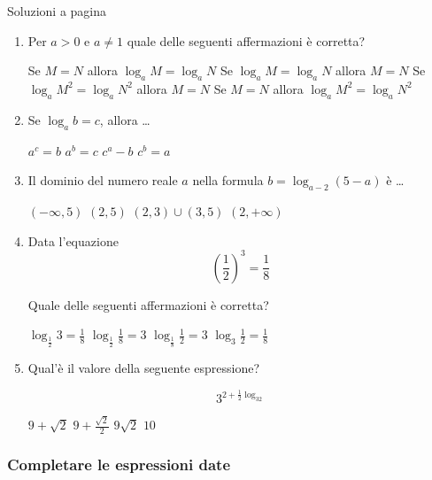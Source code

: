 Soluzioni a pagina \pageref{sol_mc} \label{ex_mc}\label{ex_mc}

\begin{enumerate}

\item Per $a>0$ e $a\neq 1$ quale delle seguenti affermazioni è corretta?

\begin{choices}
\choice Se $M=N$ allora $\log_aM=\log_aN$
\choice Se $\log_aM=\log_aN$ allora $M=N$
\choice Se $\log_aM^2=\log_aN^2$ allora $M=N$
\choice Se $M=N$ allora $\log_aM^2=\log_aN^2$
\end{choices}

\item Se $\log_ab=c$, allora \ldots

\begin{choices}
\choice $a^c=b$
\choice $a^b=c$
\choice $c^a-b$
\choice $c^b=a$
\end{choices}

\item Il dominio del numero reale $a$ nella formula $b=\log_{a-2}(5-a)$ è \ldots

\begin{choices}
\choice $(-\infty, 5)$
\choice $(2, 5)$
\choice $(2, 3)\cup(3, 5)$
\choice $(2, +\infty)$
\end{choices}

\item Data l'equazione
\[
\left(\frac{1}{2}\right)^3=\frac{1}{8}
\]

Quale delle seguenti affermazioni è corretta?


\begin{choices}
\choice $\log_{\frac{1}{2}}3=\frac{1}{8}$
\choice $\log_{\frac{1}{2}}\frac{1}{8}=3$
\choice $\log_{\frac{1}{8}}\frac{1}{2}=3$
\choice $\log_3\frac{1}{2}=\frac{1}{8}$
\end{choices}

\item Qual'è il valore della seguente espressione?

\[
3^{2+\frac{1}{2}\log_32}
\]

\begin{choices}
\choice $9+\sqrt{2}$
\choice $9+\frac{\sqrt{2}}{2}$
\choice $9\sqrt{2}$
\choice $10$
\end{choices}

\end{enumerate}

\subsubsection{Completare le espressioni date}\label{subsec:compl_espr}


